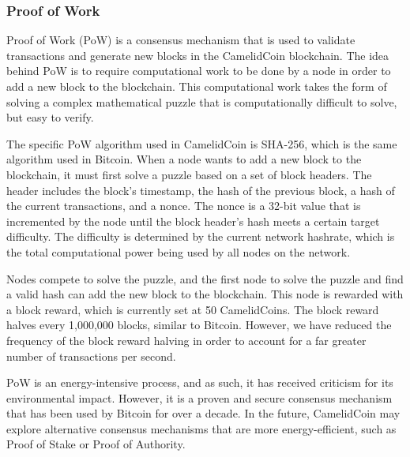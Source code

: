 \documentclass{article}
\begin{document}
\subsubsection{Proof of Work}
Proof of Work (PoW) is a consensus mechanism that is used to validate transactions and generate new blocks in the CamelidCoin blockchain. 
The idea behind PoW is to require computational work to be done by a node in order to add a new block to the blockchain. 
This computational work takes the form of solving a complex mathematical puzzle that is computationally difficult to solve, but easy to verify.

The specific PoW algorithm used in CamelidCoin is SHA-256, which is the same algorithm used in Bitcoin. 
When a node wants to add a new block to the blockchain, it must first solve a puzzle based on a set of block headers. 
The header includes the block's timestamp, the hash of the previous block, a hash of the current transactions, and a nonce. 
The nonce is a 32-bit value that is incremented by the node until the block header's hash meets a certain target difficulty. 
The difficulty is determined by the current network hashrate, which is the total computational power being used by all nodes on the network.

Nodes compete to solve the puzzle, and the first node to solve the puzzle and find a valid hash can add the new block to the blockchain. 
This node is rewarded with a block reward, which is currently set at 50 CamelidCoins. The block reward halves every 1,000,000 blocks, similar to Bitcoin.
However, we have reduced the frequency of the block reward halving in order to account for a far greater number of transactions per second.

PoW is an energy-intensive process, and as such, it has received criticism for its environmental impact. 
However, it is a proven and secure consensus mechanism that has been used by Bitcoin for over a decade.
In the future, CamelidCoin may explore alternative consensus mechanisms that are more energy-efficient, such as Proof of Stake or Proof of Authority.
\end{document}
